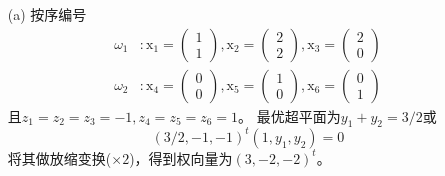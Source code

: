 \documentclass[reportComp]{thesis}
\begin{document}
\begin{answer}[\textsection 5 Q32]
\begin{itemize}
	\item [(a)] 按序编号
	\[\begin{aligned}
	\omega_{1}&: \mathrm{x}_{1}=\left(\begin{array}{c}{1} \\ {1}\end{array}\right), \mathrm{x}_{2}=\left(\begin{array}{l}{2} \\ {2}\end{array}\right), \mathrm{x}_{3}=\left(\begin{array}{l}{2} \\ {0}\end{array}\right)\\
	\omega_{2}&:\mathrm{x}_{4}=\left(\begin{array}{l}{0} \\ {0}\end{array}\right), \mathrm{x}_{5}=\left(\begin{array}{l}{1} \\ {0}\end{array}\right), \mathrm{x}_{6}=\left(\begin{array}{l}{0} \\ {1}\end{array}\right)
	\end{aligned}\]
	且$z_1=z_2=z_3=-1,z_4=z_5=z_6=1$。
	最优超平面为$y_1+y_2=3/2$或
	\[(3 / 2,-1,-1)^{t}\left(1,y_{1},y_{2}\right)=0\]
	将其做放缩变换($\times 2$)，得到权向量为$(3,-2,-2)^t$。


\end{itemize}
\end{answer}
\end{document}
